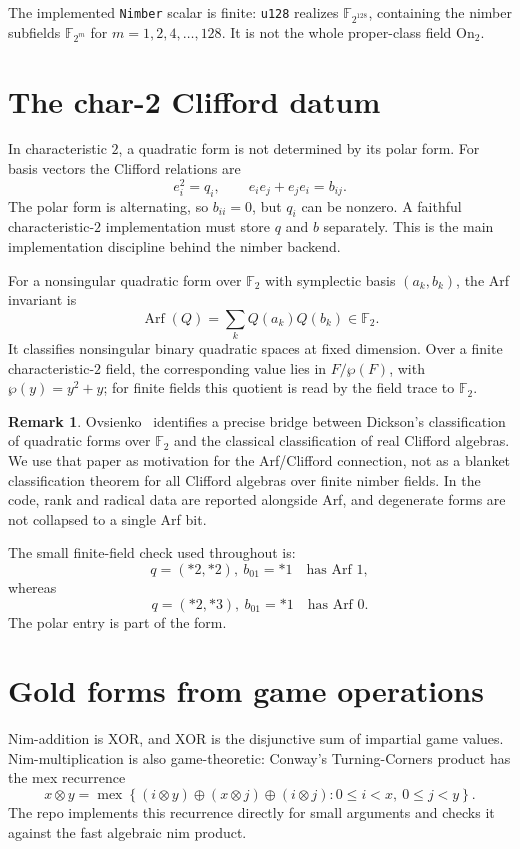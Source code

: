 \documentclass[11pt]{article}
\theoremstyle{definition}
\newtheorem{remark}{Remark}
\newcommand{\On}{\mathrm{On}_2}
\newcommand{\F}{\mathbb{F}}
\newcommand{\Arf}{\operatorname{Arf}}
\newcommand{\nimmul}{\otimes}
\begin{document}
The implemented \texttt{Nimber} scalar is finite: \texttt{u128} realizes
$\F_{2^{128}}$, containing the nimber subfields $\F_{2^m}$ for
$m=1,2,4,\ldots,128$. It is not the whole proper-class field $\On$.

\section{The char-2 Clifford datum}

In characteristic $2$, a quadratic form is not determined by its polar form.
For basis vectors the Clifford relations are
\[
  e_i^2=q_i,\qquad e_i e_j+e_j e_i=b_{ij}.
\]
The polar form is alternating, so $b_{ii}=0$, but $q_i$ can be nonzero. A
faithful characteristic-$2$ implementation must store $q$ and $b$ separately.
This is the main implementation discipline behind the nimber backend.

For a nonsingular quadratic form over $\F_2$ with symplectic basis
$(a_k,b_k)$, the Arf invariant is
\[
  \Arf(Q)=\sum_k Q(a_k)Q(b_k)\in \F_2.
\]
It classifies nonsingular binary quadratic spaces at fixed dimension. Over a
finite characteristic-$2$ field, the corresponding value lies in
$F/\wp(F)$, with $\wp(y)=y^2+y$; for finite fields this quotient is read by the
field trace to $\F_2$.

\begin{remark}
Ovsienko~\cite{Ovsienko16} identifies a precise bridge between Dickson's
classification of quadratic forms over $\F_2$ and the classical classification
of real Clifford algebras. We use that paper as motivation for the Arf/Clifford
connection, not as a blanket classification theorem for all Clifford algebras
over finite nimber fields. In the code, rank and radical data are reported
alongside Arf, and degenerate forms are not collapsed to a single Arf bit.
\end{remark}

The small finite-field check used throughout is:
\[
  q=(\ast2,\ast2),\ b_{01}=\ast1 \quad\text{has Arf }1,
\]
whereas
\[
  q=(\ast2,\ast3),\ b_{01}=\ast1 \quad\text{has Arf }0.
\]
The polar entry is part of the form.

\section{Gold forms from game operations}

Nim-addition is XOR, and XOR is the disjunctive sum of impartial game values.
Nim-multiplication is also game-theoretic: Conway's Turning-Corners product has
the mex recurrence
\begin{equation}\label{eq:tc}
  x\nimmul y
  =
  \operatorname{mex}
  \left\{
    (i\nimmul y)\oplus(x\nimmul j)\oplus(i\nimmul j):
    0\leq i<x,\ 0\leq j<y
  \right\}.
\end{equation}
The repo implements this recurrence directly for small arguments and checks it
against the fast algebraic nim product.
\end{document}
